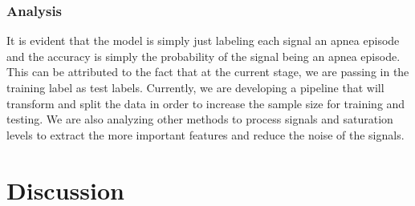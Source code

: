 \documentclass[12pt,titlepage]{article}
\begin{document}
\subsubsection{Analysis}
It is evident that the model is simply just labeling each signal an apnea episode and the accuracy is simply the probability of the signal being an apnea episode. This can be attributed to the fact that at the current stage, we are passing in the training label as test labels. Currently, we are developing a pipeline that will transform and split the data in order to increase the sample size for training and testing. We are also analyzing other methods to process signals and saturation levels to extract the more important features and reduce the noise of the signals.

\section{Discussion}
\end{document}
